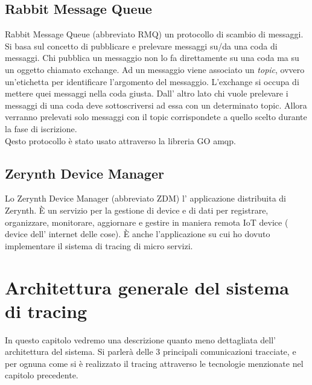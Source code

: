 \documentclass[a4paper,12pt,titlepage,italian,openany]{report}
\begin{document}
\section{Rabbit Message Queue}
Rabbit Message Queue\cite{rabbit:1} (abbreviato RMQ) un protocollo di scambio di messaggi. Si basa sul concetto di pubblicare e prelevare messaggi su/da una coda di messaggi. Chi pubblica un messaggio non lo fa direttamente su una coda ma su un oggetto chiamato exchange. Ad un messaggio viene associato un \textit{topic}, ovvero un'etichetta per identificare l'argomento del messaggio. L'exchange si occupa di mettere quei messaggi nella coda giusta. Dall' altro lato chi 
vuole prelevare i messaggi di una coda deve sottoscriversi ad essa con un determinato topic. Allora verranno prelevati solo messaggi con il topic corrispondete a quello scelto durante la fase di iscrizione.\\
Qesto protocollo è stato usato attraverso la libreria GO amqp.
\section{Zerynth Device Manager}
Lo Zerynth Device Manager\cite{zdm:1} (abbreviato ZDM) l' applicazione distribuita di Zerynth. È un servizio per la gestione di device e di dati per registrare, organizzare, monitorare, aggiornare e gestire in maniera remota IoT device ( device dell' internet delle cose).
È anche l'applicazione su cui ho dovuto implementare il sistema di tracing di micro servizi.

\chapter{Architettura generale del sistema di tracing}
In questo capitolo vedremo una descrizione quanto meno dettagliata dell' architettura del sistema. Si parlerà delle 3 principali comunicazioni tracciate, e per ognuna come si è realizzato il tracing attraverso le
tecnologie menzionate nel capitolo precedente.
\end{document}
